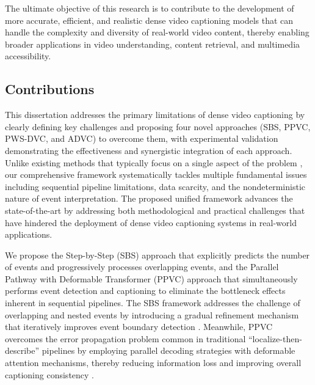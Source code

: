 The ultimate objective of this research is to contribute to the development of more accurate, efficient, and realistic dense video captioning models that can handle the complexity and diversity of real-world video content, thereby enabling broader applications in video understanding, content retrieval, and multimedia accessibility.


\subsection{Contributions}
This dissertation addresses the primary limitations of dense video captioning by clearly defining key challenges and proposing four novel approaches (SBS, PPVC, PWS-DVC, and ADVC) to overcome them, with experimental validation demonstrating the effectiveness and synergistic integration of each approach.
Unlike existing methods that typically focus on a single aspect of the problem \cite{Krishna2017-pw, Zhou2018-zu, Mun2019-ap}, our comprehensive framework systematically tackles multiple fundamental issues including sequential pipeline limitations, data scarcity, and the nondeterministic nature of event interpretation.
The proposed unified framework advances the state-of-the-art by addressing both methodological and practical challenges that have hindered the deployment of dense video captioning systems in real-world applications.

We propose the Step-by-Step (SBS) approach that explicitly predicts the number of events and progressively processes overlapping events, and the Parallel Pathway with Deformable Transformer (PPVC) approach that simultaneously performs event detection and captioning to eliminate the bottleneck effects inherent in sequential pipelines.
The SBS framework addresses the challenge of overlapping and nested events by introducing a gradual refinement mechanism that iteratively improves event boundary detection \cite{Chen2021-sv, Deng2021-qd}.
Meanwhile, PPVC overcomes the error propagation problem common in traditional ``localize-then-describe'' pipelines \cite{Li2018-ll, Wang2018-ap} by employing parallel decoding strategies with deformable attention mechanisms, thereby reducing information loss and improving overall captioning consistency \cite{Choi2022-cu}.

